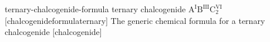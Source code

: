 \newglsXchemical%
{ternary-chalcogenide-formula}%
{ternary chalcogenide}%
{{}$\mathrm{A^{I}B^{III}C_{2}^{VI}}$}%
[chalcogenideformulaternary]%
{The generic chemical formula for a ternary chalcogenide}%
[chalcogenide]%
